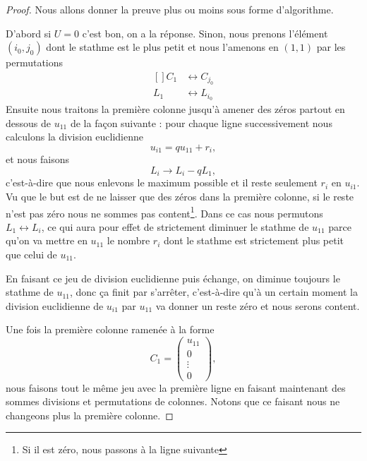\begin{proof}
	Nous allons donner la preuve plus ou moins sous forme d'algorithme.

	D'abord si \( U=0\) c'est bon, on a la réponse. Sinon, nous prenons l'élément \( (i_0,j_0)\) dont le stathme est le plus petit et nous l'amenons en \( (1,1)\) par les permutations
	\begin{equation}
		\begin{aligned}[]
			C_1 & \leftrightarrow C_{j_0} \\
			L_1 & \leftrightarrow L_{i_0}
		\end{aligned}
	\end{equation}
	Ensuite nous traitons la première colonne jusqu'à amener des zéros partout en dessous de \( u_{11}\) de la façon suivante : pour chaque ligne successivement nous calculons la division euclidienne
	\begin{equation}
		u_{i1}=qu_{11}+r_i,
	\end{equation}
	et nous faisons
	\begin{equation}
		L_i\to L_i-qL_1,
	\end{equation}
	c'est-à-dire que nous enlevons le maximum possible et il reste seulement \( r_i\) en \( u_{i1}\). Vu que le but est de ne laisser que des zéros dans la première colonne, si le reste n'est pas zéro nous ne sommes pas content\footnote{Si il est zéro, nous passons à la ligne suivante}. Dans ce cas nous permutons \( L_1\leftrightarrow L_i\), ce qui aura pour effet de strictement diminuer le stathme de \( u_{11}\) parce qu'on va mettre en \( u_{11}\) le nombre \( r_i\) dont le stathme est strictement plus petit que celui de \( u_{11}\).

	En faisant ce jeu de division euclidienne puis échange, on diminue toujours le stathme de \( u_{11}\), donc ça finit par s'arrêter, c'est-à-dire qu'à un certain moment la division euclidienne de \( u_{i1}\) par \( u_{11}\) va donner un reste zéro et nous serons content.

	Une fois la première colonne ramenée à la forme
	\begin{equation}
		C_1=\begin{pmatrix}
			u_{11} \\
			0      \\
			\vdots \\
			0
		\end{pmatrix},
	\end{equation}
	nous faisons tout le même jeu avec la première ligne en faisant maintenant des sommes divisions et permutations de colonnes. Notons que ce faisant nous ne changeons plus la première colonne.


\end{proof}
